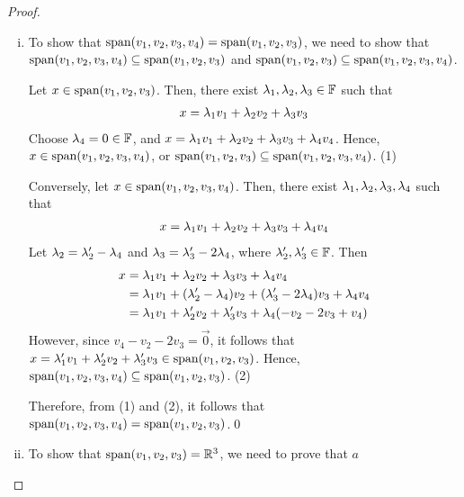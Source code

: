 \renewcommand{\qedsymbol}{$ $}
\begin{proof}
    \begin{enumerate}[(i)]
        \renewcommand{\qedsymbol}{$\blacksquare$}
        \item To show that $\textnormal{span}(v_1,v_2,v_3,v_4)=\textnormal{span}(v_1,v_2,v_3)$, we need to show that $\textnormal{span}(v_1,v_2,v_3,v_4)\subseteq\textnormal{span}(v_1,v_2,v_3)$ and $\textnormal{span}(v_1,v_2,v_3)\subseteq\textnormal{span}(v_1,v_2,v_3,v_4)$.
        
        Let $x\in\textnormal{span}(v_1,v_2,v_3)$. Then, there exist $\lambda_1,\lambda_2,\lambda_3\in\mathbb F$ such that
        \[
            \begin{aligned}
                x=\lambda_1v_1+\lambda_2v_2+\lambda_3v_3
            \end{aligned}    
        \]
        Choose $\lambda_4=0\in\mathbb F$, and $x=\lambda_1v_1+\lambda_2v_2+\lambda_3v_3+\lambda_4v_4$. Hence, $x\in\textnormal{span}(v_1,v_2,v_3,v_4)$, or $\textnormal{span}(v_1,v_2,v_3)\subseteq\textnormal{span}(v_1,v_2,v_3,v_4)$. (1)
        
        Conversely, let $x\in\textnormal{span}(v_1,v_2,v_3,v_4)$. Then, there exist $\lambda_1,\lambda_2,\lambda_3,\lambda_4$ such that
        \[
            \begin{aligned}
                x=\lambda_1v_1+\lambda_2v_2+\lambda_3v_3+\lambda_4v_4
            \end{aligned}
        \]  
        Let $\lambda_2=\lambda_2'-\lambda_4$ and $\lambda_3=\lambda_3'-2\lambda_4$, where $\lambda_2',\lambda_3'\in\mathbb F$. Then
        \[
            \begin{aligned}
                x &= \lambda_1v_1+\lambda_2v_2+\lambda_3v_3+\lambda_4v_4\\
                  &= \lambda_1v_1+(\lambda_2'-\lambda_4)v_2+(\lambda_3'-2\lambda_4)v_3+\lambda_4v_4\\
                  &= \lambda_1v_1+\lambda_2'v_2+\lambda_3'v_3+\lambda_4(-v_2-2v_3+v_4)
            \end{aligned}  
        \]
        However, since $v_4-v_2-2v_3=\vec{0}$, it follows that $x=\lambda_1'v_1+\lambda_2'v_2+\lambda_3'v_3\in\textnormal{span}(v_1,v_2,v_3)$. Hence, $\textnormal{span}(v_1,v_2,v_3,v_4)\subseteq\textnormal{span}(v_1,v_2,v_3)$. (2)

        Therefore, from (1) and (2), it follows that $\textnormal{span}(v_1,v_2,v_3,v_4)=\textnormal{span}(v_1,v_2,v_3)$.\qed
        \item To show that $\textnormal{span}(v_1,v_2,v_3)=\mathbb R^3$, we need to prove that $a$
    \end{enumerate}
\end{proof}